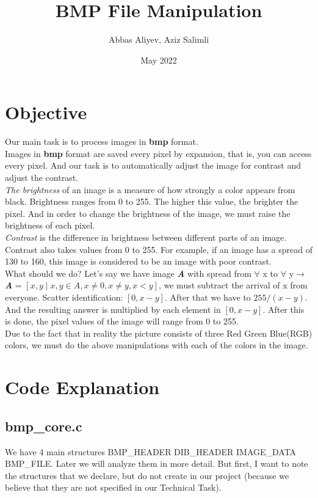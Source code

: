 \documentclass{article}
\title{BMP File Manipulation}
\author{Abbas Aliyev, Aziz Salimli }
\date{May 2022}
\begin{document}
\maketitle

\section{Objective}

Our main task is to process images in \textbf{bmp} format.
\\[1\baselineskip]
Images in \textbf{bmp} format are saved every pixel by expansion, that is, you can access every pixel. And our task is to automatically adjust the image for contrast and adjust the contrast.
\\[1\baselineskip]
\textit{The brightness} of an image is a measure of how strongly a color appears from black. Brightness ranges from 0 to 255. The higher this value, the brighter the pixel. And in order to change the brightness of the image, we must raise the brightness of each pixel.
\\[1\baselineskip]
\textit{Contrast} is the difference in brightness between different parts of an image. Contrast also takes values from 0 to 255. For example, if an image has a spread of 130 to 160, this image is considered to be an image with poor contrast.
\\[1\baselineskip]
What should we do? Let's say we have image \textbf{\textit{A}} with spread from $\forall$ x to $\forall$ y$\rightarrow$ \textbf{\textit{A}}  = $[x,y  \mid x, y \in A,x \neq 0 , x \neq y, x<y]$, we must subtract the arrival of x from everyone. Scatter identification: $[0,x-y]$. After that we have to $255/(x-y)$. And the resulting answer is multiplied by each element in $[0,x-y]$. After this is done, the pixel values of the image will range from 0 to 255.
\\[1\baselineskip]
Due to the fact that in reality the picture consists of three Red Green Blue(RGB) colors, we must do the above manipulations with each of the colors in the image.

\section{Code Explanation}
\subsection{bmp\_core.c}

We have 4 main structures BMP\_HEADER DIB\_HEADER IMAGE\_DATA BMP\_FILE. Later we will analyze them in more detail. But first, I want to note the structures that we declare, but do not create in our project (because we believe that they are not specified in our Technical Task).
\\
\end{document}
